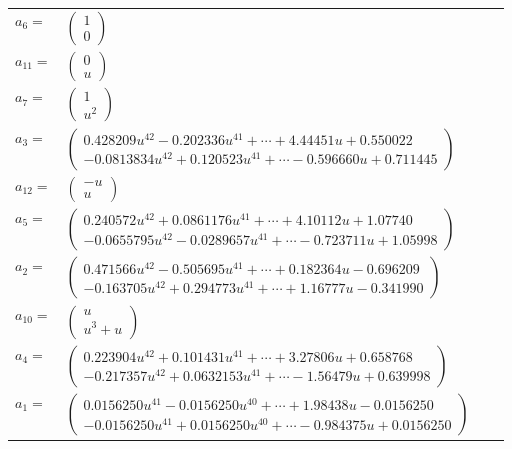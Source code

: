 \documentclass[1p]{elsarticle_modified}
\theoremstyle{definition}
\begin{document}
\begin{tabular}{m{7pt} m{180pt} m{7pt} m{180pt} }
\flushright $a_{6}=$&$\begin{pmatrix}1\\0\end{pmatrix}$ \\
\flushright $a_{11}=$&$\begin{pmatrix}0\\u\end{pmatrix}$ \\
\flushright $a_{7}=$&$\begin{pmatrix}1\\u^2\end{pmatrix}$ \\
\flushright $a_{3}=$&$\begin{pmatrix}0.428209 u^{42}-0.202336 u^{41}+\cdots+4.44451 u+0.550022\\-0.0813834 u^{42}+0.120523 u^{41}+\cdots-0.596660 u+0.711445\end{pmatrix}$ \\
\flushright $a_{12}=$&$\begin{pmatrix}- u\\u\end{pmatrix}$ \\
\flushright $a_{5}=$&$\begin{pmatrix}0.240572 u^{42}+0.0861176 u^{41}+\cdots+4.10112 u+1.07740\\-0.0655795 u^{42}-0.0289657 u^{41}+\cdots-0.723711 u+1.05998\end{pmatrix}$ \\
\flushright $a_{2}=$&$\begin{pmatrix}0.471566 u^{42}-0.505695 u^{41}+\cdots+0.182364 u-0.696209\\-0.163705 u^{42}+0.294773 u^{41}+\cdots+1.16777 u-0.341990\end{pmatrix}$ \\
\flushright $a_{10}=$&$\begin{pmatrix}u\\u^3+u\end{pmatrix}$ \\
\flushright $a_{4}=$&$\begin{pmatrix}0.223904 u^{42}+0.101431 u^{41}+\cdots+3.27806 u+0.658768\\-0.217357 u^{42}+0.0632153 u^{41}+\cdots-1.56479 u+0.639998\end{pmatrix}$ \\
\flushright $a_{1}=$&$\begin{pmatrix}0.0156250 u^{41}-0.0156250 u^{40}+\cdots+1.98438 u-0.0156250\\-0.0156250 u^{41}+0.0156250 u^{40}+\cdots-0.984375 u+0.0156250\end{pmatrix}$ \\

\end{tabular}
\end{document}
